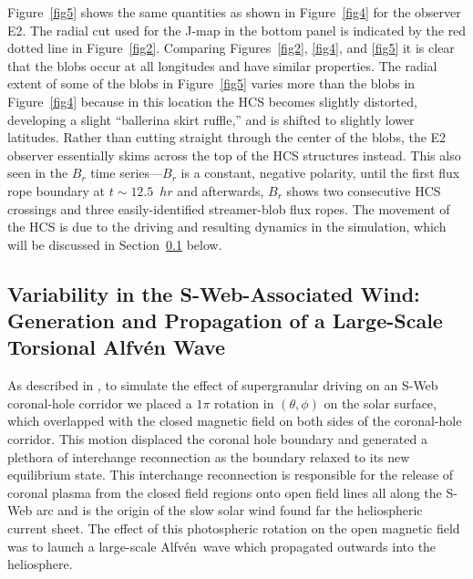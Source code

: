 \documentclass[preprint]{aastex62}
\newcommand{\Alfven}{Alfv\'{e}n\ }
\begin{document}
Figure~\ref{fig5} shows the same quantities as shown in Figure~\ref{fig4}
for the observer E2. The radial cut used for the J-map in the bottom
panel is indicated by the red dotted line in Figure~\ref{fig2}.
Comparing Figures~\ref{fig2}, \ref{fig4}, and \ref{fig5} it is clear
that the blobs occur at all longitudes and have similar properties.
The radial extent of some of the blobs in Figure~\ref{fig5} varies
more than the blobs in Figure~\ref{fig4} because in this location
the HCS becomes slightly distorted, developing a slight ``ballerina
skirt ruffle,'' and is shifted to slightly lower latitudes. Rather
than cutting straight through the center of the blobs, the E2
observer essentially skims across the top of the HCS structures
instead. This also seen in the $B_r$ time series---$B_r$ is a constant, 
negative polarity, until the first flux rope boundary at $t\sim12.5$~$hr$ 
and afterwards, $B_r$ shows two consecutive HCS crossings
and three easily-identified streamer-blob  flux ropes. The movement
of the HCS is due to the driving and resulting dynamics in the
simulation, which will be discussed in Section~\ref{ssxn_mhdwave}
below.






\subsection{Variability in the S-Web-Associated Wind: Generation and Propagation of a Large-Scale Torsional Alfv\'{e}n Wave}
\label{ssxn_mhdwave}


As described in , to simulate the effect
of supergranular driving on an S-Web coronal-hole corridor we placed
a $1 \pi$ rotation in $(\theta,\phi)$ on the solar surface, which
overlapped with the closed magnetic field on both sides of the
coronal-hole corridor. This motion displaced the coronal hole
boundary and generated a plethora of interchange reconnection as
the boundary relaxed to its new equilibrium state. This
interchange reconnection is responsible for the release of coronal
plasma from the closed field regions onto open field lines all along
the S-Web arc  and is the origin of the
slow solar wind found far the heliospheric current sheet. The effect
of this photospheric rotation on the open magnetic field was to
launch a large-scale \Alfven wave which propagated outwards into
the heliosphere.

\end{document}
